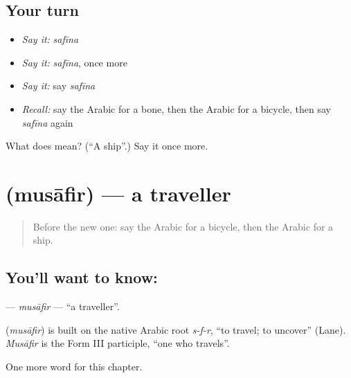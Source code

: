 \subsection*{Your turn}
\begin{itemize}
\raggedright
  \item \emph{Say it:} \emph{safīna}
  \item \emph{Say it:} \emph{safīna}, once more
  \item \emph{Say it:} say \emph{safīna}
  \item \emph{Recall:} say the Arabic for a bone, then the Arabic for a bicycle, then say \emph{safīna} again
\end{itemize}

\begin{tcolorbox}[breakable,colback=teal!4,colframe=teal!35!black,title={Before you move on}]
What does  mean? (\textquotedblleft{}A ship\textquotedblright{}.) Say it once more.
\end{tcolorbox}
\section[\texorpdfstring{\ar{مسافر} (musāfir)}{مسافر (musāfir)}]{ (musāfir) — a traveller}

\label{lesson:AR-C142-musafir}



\begin{quote}
Before the new one: say the Arabic for a bicycle, then the Arabic for a ship.
\end{quote}

\subsection*{You'll want to know: }
\textbf{} — \emph{musāfir} — \textquotedblleft{}a traveller\textquotedblright{}.

\begin{cousinweb}
\textbf{} (\emph{musāfir}) is built on the native Arabic root \emph{s-f-r}, \textquotedblleft{}to travel; to uncover\textquotedblright{} (Lane). \emph{Musāfir} is the Form III participle, \textquotedblleft{}one who travels\textquotedblright{}.
\end{cousinweb}

\begin{grammarlens}[title={What you've built}]
One more word for this chapter.
\end{grammarlens}

